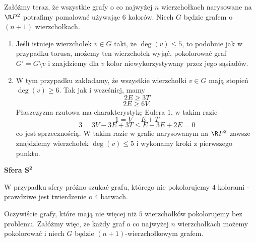 \begin{enumerate}[label=\textbf{(\alph*)}]
    Załóżmy teraz, że wszystkie grafy o co najwyżej $n$ wierzchołkach narysowane na $\R P^2$ potrafimy pomalować używając $6$ kolorów. Niech $G$ będzie grafem o $(n+1)$ wierzchołkach. 
    \begin{enumerate}[label=\arabic*.]
      \item Jeśli istnieje wierzchołek $v\in G$ taki, że $\deg(v)\leq 5$, to podobnie jak w przypadku torusa, możemy ten wierzchołek wyjąć, pokolorować graf $G'=G\setminus v$ i znajdziemy dla $v$ kolor niewykorzystywany przez jego sąsiadów.
      \item W tym przypadku zakładamy, że wszystkie wierzchołki $v\in G$ mają stopień $\deg(v)\geq 6$. Tak jak i wcześniej, mamy
        $$2E\geq 3T$$
        $$2E\geq 6V.$$
        Płaszczyzna rzutowa ma charakterystykę Eulera $1$, w takim razie
        $$1=V-E+T$$
        $$3=3V-3E+3T\leq E-3E+2E=0$$
        co jest sprzecznością. W takim razie w grafie narysowanym na $\R P^2$ zawsze znajdziemy wierzchołek $\deg(v)\leq 5$ i wykonamy kroki z pierwszego punktu.
    \end{enumerate}
%
%
    \textbf{Sfera $\mathbf{S^2}$} \dotfill

    W przypadku sfery próżno szukać grafu, którego nie pokolorujemy $4$ kolorami - prawdziwe jest twierdzenie o $4$ barwach.

    Oczywiście grafy, które mają nie więcej niż $5$ wierzchołków pokolorujemy bez problemu. Załóżmy więc, że każdy graf o co najwyżej $n$ wierzchołkach możemy pokolorować i niech $G$ będzie $(n+1)$-wierzchołkowym grafem.


\end{enumerate}
